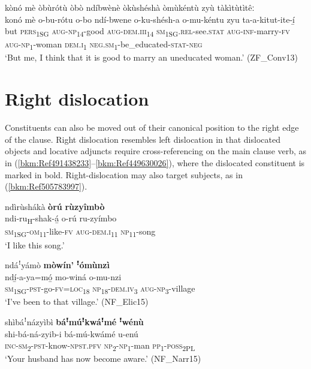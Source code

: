 \ea
\label{bkm:Ref449689652}
kònó mè òbùrótù òbò ndíbwènè òkùshéshà òmùkéntù zyù tàkìtùtìtêː\\
\gll konó   mè    o-bu-rótu    o-bo      ndí-bwene o-ku-shésh-a    o-mu-kéntu    zyu  ta-a-kitut-ite-í̲\\
but  \textsc{pers}\textsubscript{1SG}  \textsc{aug}-\textsc{np}\textsubscript{14}-good  \textsc{aug}-\textsc{dem}.\textsc{iii}\textsubscript{14} \textsc{sm}\textsubscript{1SG}.\textsc{rel}-see.\textsc{stat}
\textsc{aug}-\textsc{inf}-marry-\textsc{fv}  \textsc{aug}-\textsc{np}\textsubscript{1}-woman  \textsc{dem}.\textsc{i}\textsubscript{1}  \textsc{neg}.\textsc{sm}\textsubscript{1}-be\_educated-\textsc{stat}-\textsc{neg}\\
\glt ‘But me, I think that it is good to marry an uneducated woman.’ (ZF\_Conv13)
\z
\section{Right dislocation}
\label{bkm:Ref452042958}\hypertarget{Toc75352714}{}
Constituents can also be moved out of their canonical position to the right edge of the clause. Right dislocation resembles left dislocation in that dislocated objects and locative adjuncts require cross-referencing on the main clause verb, as in (\ref{bkm:Ref491438233}--\ref{bkm:Ref449630026}), where the dislocated constituent is marked in bold. Right-dislocation may also target subjects, as in (\ref{bkm:Ref505783997}).

\ea
\label{bkm:Ref491438233}
ndìrùshákà \textbf{òrú} \textbf{rùzyîmbò}\\
\gll ndi-ru\textsubscript{H}-shak-á̲  o-rú    ru-zyímbo\\
\textsc{sm}\textsubscript{1SG}-\textsc{om}\textsubscript{11}-like-\textsc{fv}  \textsc{aug}-\textsc{dem}.\textsc{i}\textsubscript{11}  \textsc{np}\textsubscript{11}-song\\
\glt ‘I like this song.’
\z

\ea
\label{bkm:Ref449630026}
ndáꜝyámò \textbf{mòwín’} \textbf{ꜝ}\textbf{ómùnzì}\\
\gll ndí̲-a-ya=mó̲      mo-winá  o-mu-nzi\\
\textsc{sm}\textsubscript{1SG}-\textsc{pst}-go-\textsc{fv}=\textsc{loc}\textsubscript{18} \textsc{np}\textsubscript{18}-\textsc{dem}.\textsc{iv}\textsubscript{3}  \textsc{aug}-\textsc{np}\textsubscript{3}-village\\
\glt ‘I’ve been to that village.’ (NF\_Elic15)
\z

\ea
\label{bkm:Ref505783997}
shìbáꜝnázyìbì \textbf{báꜝ}\textbf{múꜝ}\textbf{kwáꜝ}\textbf{mé} \textbf{ꜝ}\textbf{wénù}\\
\gll shi-bá-ná-zyib-i      bá-mú-kwámé  u-enú\\
\textsc{inc}-\textsc{sm}\textsubscript{2}-\textsc{pst}-know-\textsc{npst}.\textsc{pfv}  \textsc{np}\textsubscript{2}-\textsc{np}\textsubscript{1}-man    \textsc{pp}\textsubscript{1}-\textsc{poss}\textsubscript{2PL}\\
\glt ‘Your husband has now become aware.’ (NF\_Narr15)
\z

